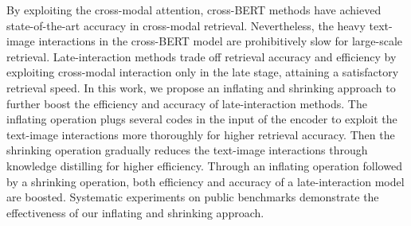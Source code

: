 By exploiting the cross-modal attention, cross-BERT methods have achieved state-of-the-art accuracy in cross-modal retrieval. Nevertheless, the heavy text-image interactions in the cross-BERT model are prohibitively slow for large-scale retrieval. Late-interaction methods trade off retrieval accuracy and efficiency by exploiting cross-modal interaction only in the late stage, attaining a satisfactory retrieval speed. In this work, we propose an inflating and shrinking approach to further boost the efficiency and accuracy of late-interaction methods. The inflating operation plugs several codes in the input of the encoder to exploit the text-image interactions more thoroughly for higher retrieval accuracy. Then the shrinking operation gradually reduces the text-image interactions through knowledge distilling for higher efficiency. Through an inflating operation followed by a shrinking operation, both efficiency and accuracy of a late-interaction model are boosted.  Systematic experiments on public benchmarks demonstrate the effectiveness of our inflating and shrinking approach.
